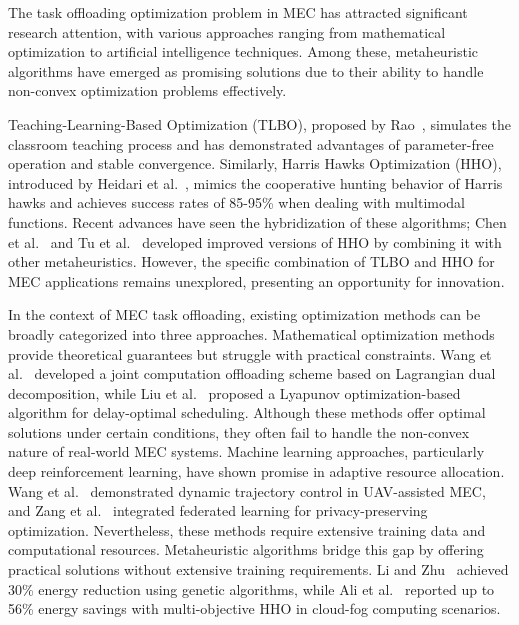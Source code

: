 \documentclass[conference]{IEEEtran}
\begin{document}
The task offloading optimization problem in MEC has attracted significant research attention, with various approaches ranging from mathematical optimization to artificial intelligence techniques. Among these, metaheuristic algorithms have emerged as promising solutions due to their ability to handle non-convex optimization problems effectively.

Teaching-Learning-Based Optimization (TLBO), proposed by Rao~\cite{b5}, simulates the classroom teaching process and has demonstrated advantages of parameter-free operation and stable convergence. Similarly, Harris Hawks Optimization (HHO), introduced by Heidari et al.~\cite{b6}, mimics the cooperative hunting behavior of Harris hawks and achieves success rates of 85-95\% when dealing with multimodal functions. Recent advances have seen the hybridization of these algorithms; Chen et al.~\cite{b7} and Tu et al.~\cite{b8} developed improved versions of HHO by combining it with other metaheuristics. However, the specific combination of TLBO and HHO for MEC applications remains unexplored, presenting an opportunity for innovation.

In the context of MEC task offloading, existing optimization methods can be broadly categorized into three approaches. Mathematical optimization methods provide theoretical guarantees but struggle with practical constraints. Wang et al.~\cite{b9} developed a joint computation offloading scheme based on Lagrangian dual decomposition, while Liu et al.~\cite{b10} proposed a Lyapunov optimization-based algorithm for delay-optimal scheduling. Although these methods offer optimal solutions under certain conditions, they often fail to handle the non-convex nature of real-world MEC systems. Machine learning approaches, particularly deep reinforcement learning, have shown promise in adaptive resource allocation. Wang et al.~\cite{b11} demonstrated dynamic trajectory control in UAV-assisted MEC, and Zang et al.~\cite{b13} integrated federated learning for privacy-preserving optimization. Nevertheless, these methods require extensive training data and computational resources. Metaheuristic algorithms bridge this gap by offering practical solutions without extensive training requirements. Li and Zhu~\cite{b12} achieved 30\% energy reduction using genetic algorithms, while Ali et al.~\cite{b14} reported up to 56\% energy savings with multi-objective HHO in cloud-fog computing scenarios.
\end{document}
